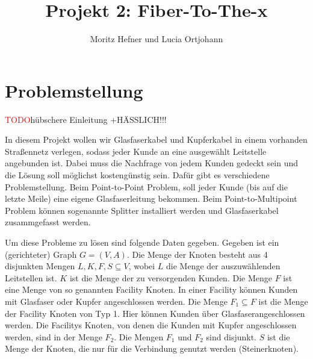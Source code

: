 \documentclass[11pt,a4paper]{article}
\title{Projekt 2: Fiber-To-The-x}
\author{Moritz Hefner und Lucia Ortjohann}
\newcommand{\TODO}{\textcolor{red}{TODO}}
\theoremstyle{my_th_style1}
\begin{document}
\maketitle
\thispagestyle{empty}
\newpage
\tableofcontents
\thispagestyle{empty}
\newpage
\setcounter{page}{1}



\section{Problemstellung}
\TODO hübschere Einleitung +HÄSSLICH!!!

In diesem Projekt wollen wir Glasfaserkabel und Kupferkabel in einem vorhanden Straßennetz verlegen, sodass jeder Kunde an eine ausgewählt Leitstelle angebunden ist. Dabei muss die Nachfrage von jedem Kunden gedeckt sein und die Lösung soll möglichst kostengünstig sein. Dafür gibt es verschiedene Problemstellung. Beim Point-to-Point Problem, soll jeder Kunde (bis auf die letzte Meile) eine eigene Glasfaserleitung bekommen. Beim Point-to-Multipoint Problem können sogenannte Splitter installiert werden und Glasfaserkabel zusammgefasst werden.

Um diese Probleme zu lösen sind folgende Daten gegeben. 
Gegeben ist ein (gerichteter) Graph $G=(V,A)$. Die Menge der Knoten besteht aus 4 disjunkten Mengen $L,K,F,S \subseteq V$, wobei $L$ die Menge der auszuwählenden Leitstellen ist. $K$ ist die Menge der zu versorgenden Kunden. Die Menge $F$ ist eine Menge von so genannten Facility Knoten. In einer Facility können Kunden mit Glasfaser oder Kupfer angeschlossen werden. Die Menge $F_1 \subseteq F$ ist die Menge der Facility Knoten von Typ 1. Hier können Kunden über Glasfaserangeschlossen werden. Die Facilitys Knoten, von denen die Kunden mit Kupfer angeschlossen werden, sind in der Menge $F_2$. Die Mengen $F_1$ und $F_2$ sind disjunkt.
$S$ ist die Menge der Knoten, die nur für die Verbindung genutzt werden (Steinerknoten). 
\end{document}
